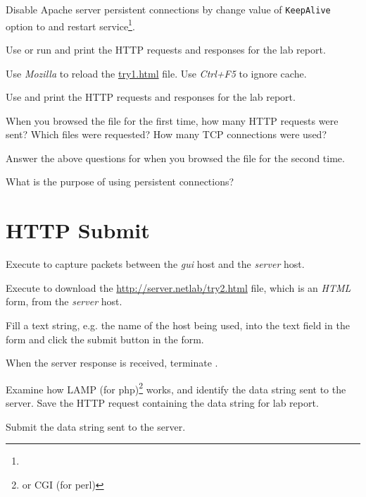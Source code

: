 \documentclass{../UTNetLab}
\begin{document}
Disable Apache server persistent connections by change value of \texttt{KeepAlive} option to  and restart  service\footnote{}.


Use  or run  and print the HTTP requests and responses for the lab report.

Use \textit{Mozilla} to reload the \url{try1.html} file.
Use \textit{Ctrl+F5} to ignore cache.

Use  and print the HTTP requests and responses for the lab report.

\begin{report}
    \item When you browsed the  file for the first time, how many HTTP requests were sent?
    Which files were requested?
    How many TCP connections were used?

    \item Answer the above questions for when you browsed the  file for the second time.

    \item What is the purpose of using persistent connections?
\end{report}

\section{HTTP Submit}
Execute  to capture packets between the \textit{gui} host and the \textit{server} host.

 Execute to download the \url{http://server.netlab/try2.html} file, which is an \textit{HTML} form, from the \textit{server} host.

Fill a text string, e.g. the name of the host being used, into the text field in the form and click the submit button in the form.

When the server response is received, terminate .

Examine how LAMP (for php)\footnote{or CGI (for perl)} works, and identify the data string sent to the server.
Save the HTTP request containing the data string for lab report.

\begin{report}
    \item Submit the data string sent to the server.
\end{report}
\end{document}
